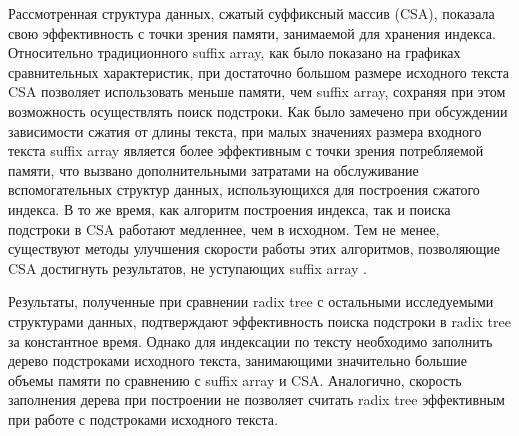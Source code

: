 
Рассмотренная структура данных, сжатый суффиксный массив (CSA), показала свою эффективность
с точки зрения памяти, занимаемой для хранения индекса. Относительно традиционного
suffix array, как было показано на графиках сравнительных характеристик,
при достаточно большом размере исходного текста CSA позволяет использовать меньше памяти, чем
suffix array, сохраняя при этом возможность осуществлять поиск подстроки.
Как было замечено при обсуждении зависимости сжатия от длины текста,
при малых значениях размера входного текста suffix array является более эффективным с точки
зрения потребляемой памяти, что вызвано дополнительными затратами на обслуживание
вспомогательных структур данных, использующихся для построения сжатого индекса.
В то же время, как алгоритм построения индекса, так и поиска подстроки в CSA работают
медленнее, чем в исходном. Тем не менее, существуют методы улучшения скорости
работы этих алгоритмов, позволяющие CSA достигнуть результатов, не уступающих suffix array \cite{andersensimple}.

Результаты, полученные при сравнении radix tree с остальными исследуемыми структурами данных,
подтверждают эффективность поиска подстроки в radix tree за константное время. Однако
для индексации по тексту необходимо заполнить дерево подстроками исходного текста,
занимающими значительно большие объемы памяти по сравнению с suffix array и CSA.
Аналогично, скорость заполнения дерева при построении не позволяет считать radix tree
эффективным при работе с подстроками исходного текста.
